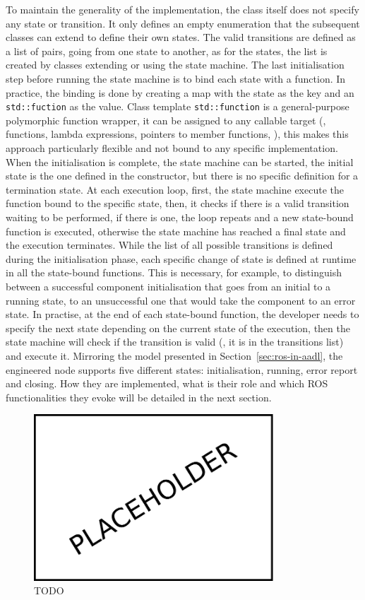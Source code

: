 To maintain the generality of the implementation, the class itself does not specify any state or transition. It only defines an empty enumeration that the subsequent classes can extend to define their own states. The valid transitions are defined as a list of pairs, going from one state to another, as for the states, the list is created by classes extending or using the state machine. The last initialisation step before running the state machine is to bind each state with a function. In practice, the binding is done by creating a map with the state as the key and an \texttt{std::fuction} as the value. Class template \texttt{std::function} is a general-purpose polymorphic function wrapper, it can be assigned to any callable target (\eg, functions, lambda expressions, pointers to member functions, \etc), this makes this approach particularly flexible and not bound to any specific implementation. When the initialisation is complete, the state machine can be started, the initial state is the one defined in the constructor, but there is no specific definition for a termination state. At each execution loop, first, the state machine execute the function bound to the specific state, then, it checks if there is a valid transition waiting to be performed, if there is one, the loop repeats and a new state-bound function is executed, otherwise the state machine has reached a final state and the execution terminates. While the list of all possible transitions is defined during the initialisation phase, each specific change of state is defined at runtime in all the state-bound functions. This is necessary, for example, to distinguish between a successful component initialisation that goes from an initial to a running state, to an unsuccessful one that would take the component to an error state. In practise, at the end of each state-bound function, the developer needs to specify the next state depending on the current state of the execution, then the state machine will check if the transition is valid (\ie, it is in the transitions list) and execute it. Mirroring the model presented in Section~\ref{sec:ros-in-aadl}, the engineered node supports five different states: initialisation, running, error report and closing. How they are implemented, what is their role and which ROS functionalities they evoke will be detailed in the next section.

\begin{figure}[t]
    \centering
    \includegraphics[width=0.8\textwidth]{gfx/placeholder}
    \caption{TODO}\label{fig:state-machine}
\end{figure}

